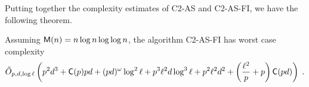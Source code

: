 Putting together the complexity estimates of C2-AS and C2-AS-FI, we
have the following theorem.

\begin{theorem}
  \label{th:complexity}
  Assuming $\mathsf{M}(n) = n\log n\log\log n$, the algorithm C2-AS-FI has
  worst case complexity
  \begin{equation*}
    \tilde{O}_{p,d,\log\ell}\left(
      p^2d^3 +
      \mathsf{C}(p)pd +
      (pd)^\omega\log^2\ell +
      p^3\ell^2 d\log^3\ell + 
      p^2\ell^2 d^2+
      \left(\frac{\ell^2}{p} + p\right)\mathsf{C}(pd)
    \right)
    \;\text{.}
  \end{equation*}
\end{theorem}



%
